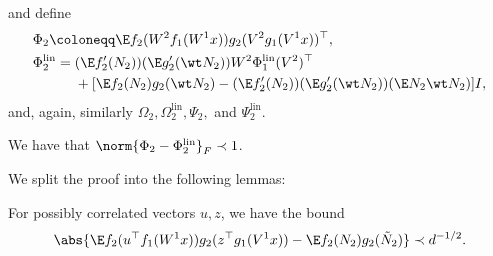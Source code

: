 and define
\begin{equation}
\begin{aligned}
    &\Phi_2 \coloneqq \E f_2(W^2f_1(W^1 x)) g_2(V^2g_1(V^1x))^\top, \\
    &\Phi_2^{\mathrm{lin}} = (\E f_2'(N_2))(\E g_2'(\wt N_2)) W^2 \Phi_1^{\mathrm{lin}}(V^2)^\top \\
    &\qquad \quad + [\E f_2(N_2)g_2(\wt N_2)-(\E f_2'(N_2))(\E g_2'(\wt N_2))(\E N_2 \wt N_2)] I, \\
\end{aligned}
\end{equation}
and, again, similarly \(\Omega_2, \Omega_2^{\mathrm{lin}}, \Psi_2,\) and  \(\Psi_2^{\mathrm{lin}}\).
\begin{theorem}
\label{thm:lin_app}
    We have that \(\norm{\Phi_2 - \Phi_2^{\mathrm{lin}}}_F \prec 1\).
\end{theorem}
We split the proof into the following lemmas:
\begin{lemma}
\label{lem:diag}
For possibly correlated vectors \(u, z\), we have the bound
    \begin{equation}
        \abs{\E f_2(u^{\top} f_1(W^1 x)) g_2(z^{\top} g_1(V^1 x)) - \E f_2(N_2)g_2(\tilde N_2)} \prec d^{-1/2}.
    \end{equation}
\end{lemma}

